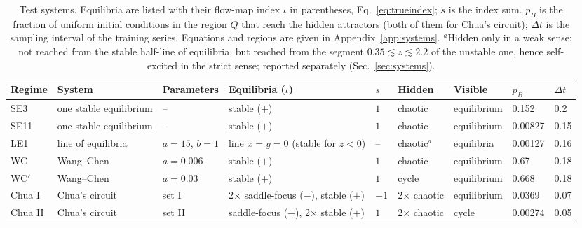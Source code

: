 \documentclass[aip,cha,reprint,amsmath,amssymb,longbibliography]{revtex4-2}
\theoremstyle{definition}
\begin{document}
\begin{table}
\caption{Test systems. Equilibria are listed with their flow-map index $\iota$ in parentheses, Eq.~\eqref{eq:trueindex};
$s$ is the index sum. $p_B$ is the fraction of uniform initial conditions in the region $Q$ that reach the hidden
attractors (both of them for Chua's circuit); $\Delta t$ is the sampling interval of the training series. Equations and
regions are given in Appendix~\ref{app:systems}. $^{a}$Hidden only in a weak sense: not reached from the stable half-line of
equilibria, but reached from the segment $0.35\lesssim z\lesssim2.2$ of the unstable one, hence self-excited in the strict
sense; reported separately (Sec.~\ref{sec:systems}).}
\label{tab:systems}
\begin{ruledtabular}
\begin{tabular}{lllllllll}
Regime & System & Parameters & Equilibria ($\iota$) & $s$ & Hidden & Visible & $p_B$ & $\Delta t$ \\
\hline
SE3 & one stable equilibrium & -- & stable ($+$) & $1$ & chaotic & equilibrium & 0.152 & 0.2 \\
SE11 & one stable equilibrium & -- & stable ($+$) & $1$ & chaotic & equilibrium & 0.00827 & 0.15 \\
LE1 & line of equilibria & $a=15$, $b=1$ & line $x=y=0$ (stable for $z<0$) & -- & chaotic$^{a}$ & equilibria & 0.00127 & 0.16 \\
WC & Wang--Chen & $a=0.006$ & stable ($+$) & $1$ & chaotic & equilibrium & 0.67 & 0.18 \\
WC$'$ & Wang--Chen & $a=0.03$ & stable ($+$) & $1$ & cycle & equilibrium & 0.668 & 0.18 \\
Chua I & Chua's circuit & set I & 2$\times$ saddle-focus ($-$), stable ($+$) & $-1$ & 2$\times$ chaotic & equilibrium & 0.0369 & 0.07 \\
Chua II & Chua's circuit & set II & saddle-focus ($-$), 2$\times$ stable ($+$) & $1$ & 2$\times$ chaotic & cycle & 0.00274 & 0.05 \\
\end{tabular}
\end{ruledtabular}
\end{table}
\end{document}
